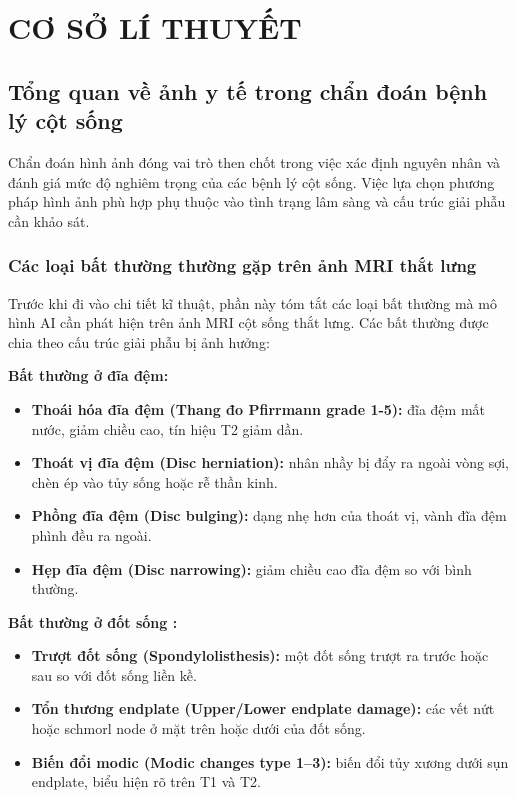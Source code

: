 \chapter{CƠ SỞ LÍ THUYẾT}

\section{Tổng quan về ảnh y tế trong chẩn đoán bệnh lý cột sống}
Chẩn đoán hình ảnh đóng vai trò then chốt trong việc xác định nguyên nhân và đánh giá mức độ nghiêm trọng của các bệnh lý cột sống. Việc lựa chọn phương pháp hình ảnh phù hợp phụ thuộc vào tình trạng lâm sàng và cấu trúc giải phẫu cần khảo sát.

\subsection{Các loại bất thường thường gặp trên ảnh MRI thắt lưng}
Trước khi đi vào chi tiết kĩ thuật, phần này tóm tắt các loại bất thường mà mô hình AI cần phát hiện trên ảnh MRI cột sống thắt lưng. Các bất thường được chia theo cấu trúc giải phẫu bị ảnh hưởng:

\textbf{Bất thường ở đĩa đệm:}
\begin{itemize}
    \item \textbf{Thoái hóa đĩa đệm (Thang đo Pfirrmann grade 1-5):} đĩa đệm mất nước, giảm chiều cao, tín hiệu T2 giảm dần.
    \item \textbf{Thoát vị đĩa đệm (Disc herniation):} nhân nhầy bị đẩy ra ngoài vòng sợi, chèn ép vào tủy sống hoặc rễ thần kinh.
    \item \textbf{Phồng đĩa đệm (Disc bulging):} dạng nhẹ hơn của thoát vị, vành đĩa đệm phình đều ra ngoài.
    \item \textbf{Hẹp đĩa đệm (Disc narrowing):} giảm chiều cao đĩa đệm so với bình thường.
\end{itemize}

\textbf{Bất thường ở đốt sống :}
\begin{itemize}
    \item \textbf{Trượt đốt sống (Spondylolisthesis):} một đốt sống trượt ra trước hoặc sau so với đốt sống liền kề.
    \item \textbf{Tổn thương endplate (Upper/Lower endplate damage):} các vết nứt hoặc schmorl node ở mặt trên hoặc dưới của đốt sống.
    \item \textbf{Biến đổi modic (Modic changes type 1--3):} biến đổi tủy xương dưới sụn endplate, biểu hiện rõ trên T1 và T2.
\end{itemize}

